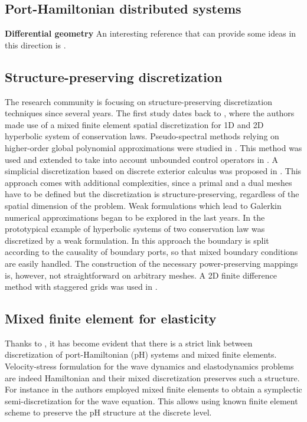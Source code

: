 \subsection{Port-Hamiltonian distributed systems}
\textbf{Differential geometry}
An interesting reference that can provide some ideas in this direction is \cite{yao2011modeling,nishida2004}. \\



\subsection{Structure-preserving discretization}

The research community is focusing on structure-preserving discretization techniques since several years. The first study dates back to \cite{golo2004hamiltonian}, where the authors made use of a mixed finite element spatial discretization for 1D and 2D hyperbolic system of conservation laws. Pseudo-spectral methods relying on higher-order global polynomial approximations were studied in \cite{moulla2012pseudo}. This method was used and extended to take into account unbounded control operators in \cite{cardoso2017}. A simplicial discretization based on discrete exterior calculus was proposed in \cite{seslija2012discrete}. This approach comes with additional complexities, since a primal and a dual meshes have to be defined but the discretization is structure-preserving, regardless of the spatial dimension of the problem. Weak formulations which lead to Galerkin numerical approximations began to be explored in the last years. In \cite{kotyczka2018weak} the prototypical example of hyperbolic systems of two conservation law was discretized by a weak formulation. In this approach the boundary is split according to the causality of boundary ports, so that mixed boundary conditions are easily handled. The construction of the necessary power-preserving mappings is, however, not straightforward on arbitrary meshes. A 2D finite difference method with staggered grids was used in \cite{trenchant2018}.

\subsection{Mixed finite element for elasticity}

Thanks to \cite{cardoso2018pfem}, it has become evident that there is a strict link between  discretization of port-Hamiltonian (pH) systems and mixed finite elements. Velocity-stress formulation for the wave dynamics and elastodynamics problems are indeed Hamiltonian and their mixed discretization preserves such a structure. For instance in \cite{kirby2015} the authors employed mixed finite elements to obtain a  symplectic semi-discretization for the wave equation. This allows using known finite element scheme to preserve the pH structure at the discrete level. \\

